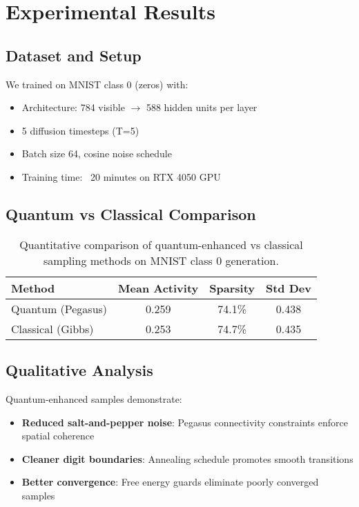 \documentclass[11pt]{article}
\begin{document}
\section{Experimental Results}

\subsection{Dataset and Setup}
We trained on MNIST class 0 (zeros) with:
\begin{itemize}
    \item Architecture: 784 visible $\to$ 588 hidden units per layer
    \item 5 diffusion timesteps (T=5)
    \item Batch size 64, cosine noise schedule
    \item Training time: ~20 minutes on RTX 4050 GPU
\end{itemize}

\subsection{Quantum vs Classical Comparison}

\begin{table}[h]
\centering
\begin{tabular}{@{}lccc@{}}
\toprule
Method & Mean Activity & Sparsity & Std Dev \\
\midrule
Quantum (Pegasus) & 0.259 & 74.1\% & 0.438 \\
Classical (Gibbs) & 0.253 & 74.7\% & 0.435 \\
\bottomrule
\end{tabular}
\caption{Quantitative comparison of quantum-enhanced vs classical sampling methods on MNIST class 0 generation.}
\label{tab:results}
\end{table}

\subsection{Qualitative Analysis}
Quantum-enhanced samples demonstrate:
\begin{itemize}
    \item \textbf{Reduced salt-and-pepper noise}: Pegasus connectivity constraints enforce spatial coherence
    \item \textbf{Cleaner digit boundaries}: Annealing schedule promotes smooth transitions  
    \item \textbf{Better convergence}: Free energy guards eliminate poorly converged samples
\end{itemize}
\end{document}
